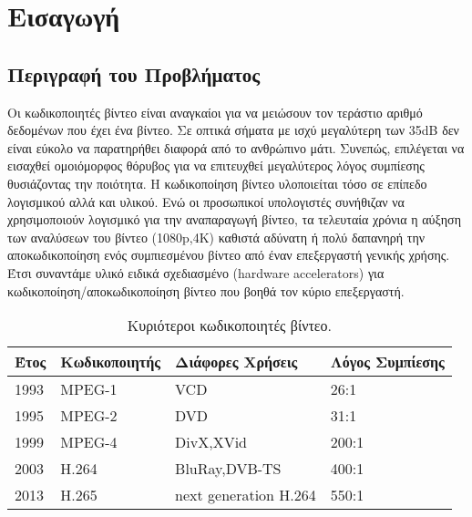 ﻿\chapter{Εισαγωγή}
\label{chapter:chap1}

\section{Περιγραφή του Προβλήματος}
\label{section:sect11}
\indent
Οι κωδικοποιητές βίντεο είναι αναγκαίοι για να μειώσουν τον τεράστιο αριθμό δεδομένων που έχει ένα βίντεο. Σε οπτικά σήματα με ισχύ μεγαλύτερη των \si{35}{dB} δεν είναι εύκολο να παρατηρήθει διαφορά από το ανθρώπινο μάτι. Συνεπώς, επιλέγεται να εισαχθεί ομοιόμορφος θόρυβος για να επιτευχθεί μεγαλύτερος λόγος συμπίεσης θυσιάζοντας την ποιότητα.
Η κωδικοποίηση βίντεο υλοποιείται τόσο σε επίπεδο λογισμικού αλλά και υλικού. Ενώ οι προσωπικοί υπολογιστές συνήθιζαν να χρησιμοποιούν λογισμικό για την αναπαραγωγή βίντεο, τα τελευταία χρόνια η αύξηση των αναλύσεων του βίντεο (1080p,4K) καθιστά αδύνατη ή πολύ δαπανηρή την αποκωδικοποίηση ενός συμπιεσμένου βίντεο από έναν επεξεργαστή γενικής χρήσης. Έτσι συναντάμε υλικό ειδικά σχεδιασμένο (hardware accelerators) για κωδικοποίηση/αποκωδικοποίηση βίντεο που βοηθά τον κύριο επεξεργαστή.

\begin{table}[h!]
    \begin{center}
        \begin{tabular}{| l | l | l | l |}
        \hline
        Έτος  & Κωδικοποιητής & Διάφορες Χρήσεις      & Λόγος Συμπίεσης           \\ \hline
        1993    & MPEG-1        &       VCD             &       26:1                \\ \hline
        1995    & MPEG-2        &       DVD             &       31:1                \\ \hline
        1999    & MPEG-4        &    DivX,XVid          &      200:1                \\ \hline
        2003    & H.264         & BluRay,DVB-TS         &      400:1                \\ \hline
        2013    & H.265         & next generation H.264 &      550:1                \\ \hline
        \hline
        \end{tabular}
    \end{center}

    \caption{Κυριότεροι κωδικοποιητές βίντεο. \cite{wiki:codecs}}
    \label{table:listofcodecs}
\end{table}

